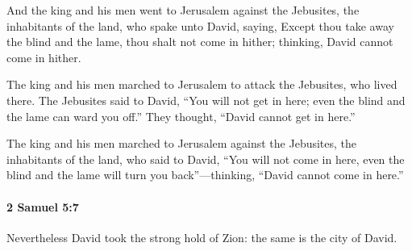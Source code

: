 			\begin{versebox}
					\item[BHS] 
					\item[ASV] And the king and his men went to Jerusalem against the Jebusites, the inhabitants of the land, who spake unto David, saying, Except thou take away the blind and the lame, thou shalt not come in hither; thinking, David cannot come in hither.
					\item[NIV] The king and his men marched to Jerusalem to attack the Jebusites, who lived there. The Jebusites said to David, “You will not get in here; even the blind and the lame can ward you off.” They thought, “David cannot get in here.”
					\item[NRSV] The king and his men marched to Jerusalem against the Jebusites, the inhabitants of the land, who said to David, “You will not come in here, even the blind and the lame will turn you back”—thinking, “David cannot come in here.”
			\end{versebox}

		\paragraph{2 Samuel 5:7} %
			\label{2SAMUEL-5-7}

			Nevertheless David took the strong hold of Zion: the same is the city of David.

